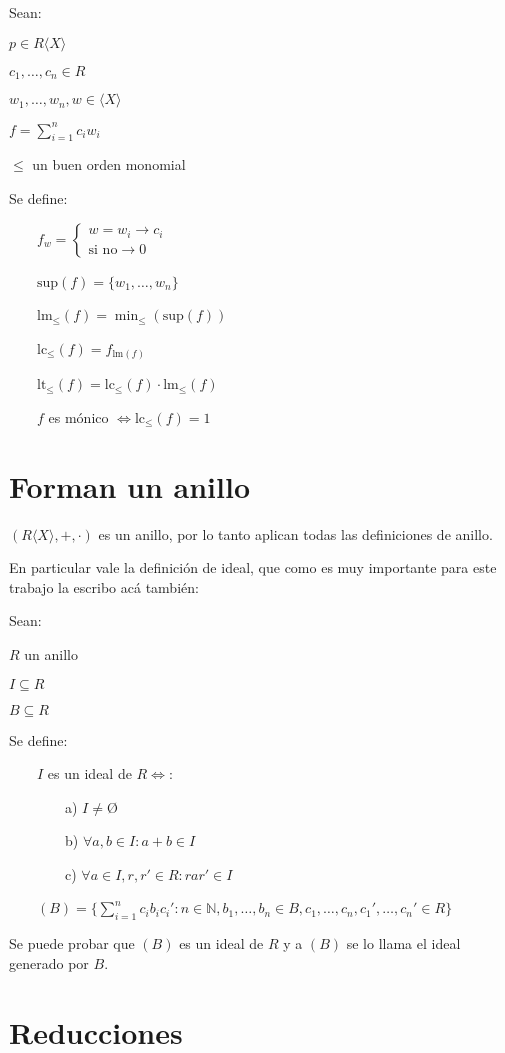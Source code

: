\documentclass{amsbook}
\begin{document}
Sean:

$p ∈ R⟨X⟩$

$c_1, …, c_n ∈ R$

$w_1, …, w_n, w ∈ ⟨X⟩$

$f = \sum_{i = 1}^n c_i w_i$

$≤$ un buen orden monomial

Se define:

    $f_w = \left\{\begin{array}{ll} w = w_i → c_i \\ \text{si no} → 0  \end{array} \right. $

    $\text{sup}(f) = \{w_1, …, w_n\}$

    $\text{lm}_≤(f) = \min_≤(\text{sup}(f))$

    $\text{lc}_≤(f) = f_{\text{lm}(f)}$

    $\text{lt}_≤(f) = \text{lc}_≤(f) · \text{lm}_≤(f)$

    $f$ es mónico $⇔ \text{lc}_≤(f) = 1$

\section{Forman un anillo}

$(R⟨X⟩, +, ·)$ es un anillo, por lo tanto aplican todas las definiciones de anillo.

En particular vale la definición de ideal, que como es muy importante para este trabajo la escribo acá también:

Sean:

$R$ un anillo

$I ⊆ R$

$B ⊆ R$

Se define:

    $I$ es un ideal de $R ⇔$:

        a) $I ≠ Ø$

        b) $∀a, b ∈ I : a + b ∈ I$

        c) $∀a ∈ I, r, r' ∈ R : rar' ∈ I$

    $(B) = \{\sum_{i = 1}^n c_i b_i c_i' : n ∈ ℕ, b_1, …, b_n ∈ B, c_1, …, c_n, c_1', …, c_n' ∈ R\}$

Se puede probar que $(B)$ es un ideal de $R$ y a $(B)$ se lo llama el ideal generado por $B$.

\section{Reducciones}
\end{document}
